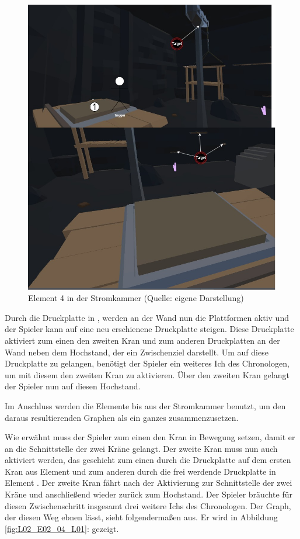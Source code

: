 \begin{figure}[ht]
\centering
\includegraphics[width=0.8\linewidth]{content/pictures/Raetsel-L02_R01_R04.jpg}
\caption{Element 4 in der Stromkammer (Quelle: eigene Darstellung)}
\label{fig:L02_R01_R04}
\end{figure}

Durch die Druckplatte in , werden an der Wand nun die Plattformen aktiv und der Spieler kann auf eine neu erschienene Druckplatte steigen. Diese Druckplatte aktiviert zum einen den zweiten Kran und zum anderen Druckplatten an der Wand neben dem Hochstand, der ein Zwischenziel darstellt. Um auf diese Druckplatte zu gelangen, benötigt der Spieler ein weiteres Ich des Chronologen, um mit diesem den zweiten Kran zu aktivieren. Über den zweiten Kran gelangt der Spieler nun auf diesen Hochstand.

Im Anschluss werden die Elemente  bis  aus der Stromkammer benutzt, um den daraus resultierenden Graphen als ein ganzes zusammenzusetzen.

Wie erwähnt muss der Spieler zum einen den Kran in Bewegung setzen, damit er an die Schnittstelle der zwei Kräne gelangt. Der zweite Kran muss nun auch aktiviert werden, das geschieht zum einen durch die Druckplatte auf dem ersten Kran aus Element  und zum anderen durch die frei werdende Druckplatte in Element . Der zweite Kran fährt nach der Aktivierung zur Schnittstelle der zwei Kräne und anschließend wieder zurück zum Hochstand. Der Spieler bräuchte für diesen Zwischenschritt insgesamt drei weitere Ichs des Chronologen. Der Graph, der diesen Weg ebnen lässt, sieht folgendermaßen aus. Er wird in Abbildung \ref{fig:L02_E02_04_L01}:  gezeigt.

